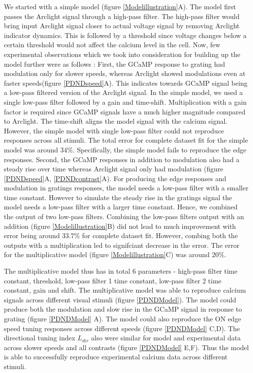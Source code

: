 \documentclass[9pt,lineno]{elife}
\begin{document}
We started with a simple model (figure \ref{Modelillustration}A). The model first passes the Arclight signal through a high-pass filter. The high-pass filter would bring input Arclight signal closer to actual voltage signal by removing Arclight indicator dynamics. This is followed by a threshold since voltage changes below a certain threshold would not affect the calcium level in the cell. Now, few experimental observations which we took into consideration for building up the model further were as follows : First, the GCaMP response to grating had modulation only for slower speeds, whereas Arclight showed modulations even at faster speeds(figure \ref{PDNDspeed}A). This indicates towards GCaMP signal being a low-pass filtered version of the Arclight signal. In the simple model, we used a single low-pass filter followed by a gain and time-shift. Multiplication with a gain factor is required since GCaMP signals have a much higher magnitude compared to Arclight. The time-shift aligns the model signal with the calcium signal. However, the simple model with single low-pass filter could not reproduce responses across all stimuli. The total error for complete dataset fit for the simple model was around $34\%$. Specifically, the simple model fails to reproduce the edge responses. Second, the GCaMP responses in addition to modulation also had a steady rise over time whereas Arclight signal only had modulation (figure \ref{PDNDspeed}A, \ref{PDNDcontrast}A). For producing the edge responses and modulation in gratings responses, the model needs a low-pass filter with a smaller time constant. However to simulate the steady rise in the gratings signal the model needs a low-pass filter with a larger time constant. Hence, we combined the output of two low-pass filters. Combining the low-pass filters output with an addition (figure \ref{Modelillustration}B) did not lead to much improvement with error being around $33.7\%$ for complete dataset fit. However, combing both the outputs with a multiplication led to signifciant decrease in the error. The error for the multiplicative model (figure \ref{Modelillustration}C) was around $20\%$. 

The multiplicative model thus has in total 6 parameters - high-pass filter time constant, threshold, low-pass filter 1 time constant, low-pass filter 2 time constant, gain and shift.  The multiplicative model was able to reproduce calcium signals across different visual stimuli (figure \ref{PDNDModel}). The model could produce both the modulation and slow rise in the GCaMP signal in response to grating (figure \ref{PDNDModel} A). The model could also reproduce the ON edge speed tuning responses across different speeds (figure \ref{PDNDModel} C,D). The directional tuning index $L_{dir}$ also were similar for model and experimental data across slower speeds and all contrasts (figure \ref{PDNDModel} E,F). Thus the model is able to successfully reproduce experimental calcium data across different stimuli.  
\end{document}
